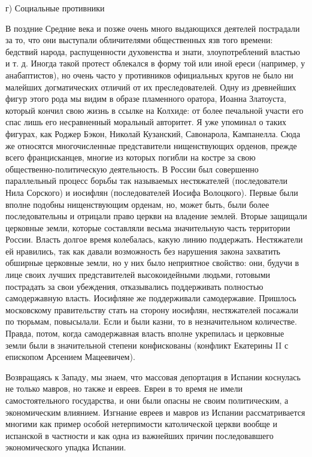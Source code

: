 г) Социальные противники

В  поздние  Средние  века  и позже  очень  много  выдающихся  деятелей
пострадали  за то,  что  они выступали  обличителями общественных  язв
того  времени: бедствий  народа,  распущенности  духовенства и  знати,
злоупотреблений властью и т. д. Иногда такой протест облекался в форму
той  или иной  ереси  (например,  у анабаптистов),  но  очень часто  у
противников  официальных  кругов  не было  ни  малейших  догматических
отличий от их преследователей. Одну  из древнейших фигур этого рода мы
видим в  образе пламенного  оратора, Иоанна Златоуста,  который кончил
свою жизнь  в ссылке на  Колхиде: от  более печальной участи  его спас
лишь  его несравненный  моральный авторитет.  Я уже  упоминал о  таких
фигурах, как Роджер Бэкон,  Николай Кузанский, Савонарола, Кампанелла.
Сюда же относятся  многочисленные представители нищенствующих орденов,
прежде всего  францисканцев, многие  из которых  погибли на  костре за
свою  общественно-политическую деятельность.  В России  был совершенно
параллельный процесс борьбы так называемых нестяжателей (последователи
Нила Сорского)  и иосифлян  (последователей Иосифа  Волоцкого). Первые
были вполне подобны нищенствующим орденам,  но, может быть, были более
последовательны  и отрицали  право церкви  на владение  землей. Вторые
защищали  церковные  земли,  которые  составляли  весьма  значительную
часть территории  России. Власть долгое время  колебалась, какую линию
поддержать. Нестяжатели  ей нравились, так как  давали возможность без
нарушения закона  захватить обширные  церковные земли,  но у  них было
неприятное свойство:  они, будучи  в лице своих  лучших представителей
высокоидейными   людьми,  готовыми   пострадать  за   свои  убеждения,
отказывались поддерживать полностью самодержавную власть. Иосифляне же
поддерживали самодержавие. Пришлось московскому правительству стать на
сторону иосифлян, нестяжателей посажали по тюрьмам, повысылали. Если и
были  казни,  то в  незначительном  количестве.  Правда, потом,  когда
самодержавная  власть  вполне  укрепилась  и церковные  земли  были  в
значительной степени  конфискованы (конфликт Екатерины II  с епископом
Арсением Мацеевичем).

Возвращаясь  к Западу,  мы знаем,  что массовая  депортация в  Испании
коснулась не  только мавров, но  также и евреев.  Евреи в то  время не
имели  самостоятельного  государства,  и  они  были  опасны  не  своим
политическим,  а  экономическим  влиянием. Изгнание  евреев  и  мавров
из  Испании рассматривается  многими  как  пример особой  нетерпимости
католической  церкви вообще  и испанской  в  частности и  как одна  из
важнейших причин последовавшего экономического упадка Испании.

